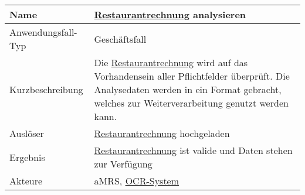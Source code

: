 \begin{table}[H]
    \centering
    \label{RestaurantRechnungAnalysieren}
    \begin{tabularx}{\textwidth}{| l | X |}
        \hline
        Name               & \hyperref[gls:restaurantRechnung]{Restaurantrechnung} analysieren                                                                                                                                                       \\
        \hline
        Anwendungsfall-Typ & Geschäftsfall                                                                                                                                                                                                           \\
        \hline
        Kurzbeschreibung   & Die \hyperref[gls:restaurantRechnung]{Restaurantrechnung} wird auf das Vorhandensein aller Pflichtfelder überprüft. Die Analysedaten werden in ein Format gebracht, welches zur Weiterverarbeitung genutzt werden kann. \\
        \hline
        Auslöser           & \hyperref[gls:restaurantRechnung]{Restaurantrechnung} hochgeladen                                                                                                                                                       \\
        \hline
        Ergebnis           & \hyperref[gls:restaurantRechnung]{Restaurantrechnung} ist valide und Daten stehen zur Verfügung                                                                                                                         \\
        \hline
        Akteure            & \ac{aMRS}, \hyperref[gls:ocr-System]{OCR-System}                                                                                                                                                                \\
        \hline
    \end{tabularx}
\end{table}


